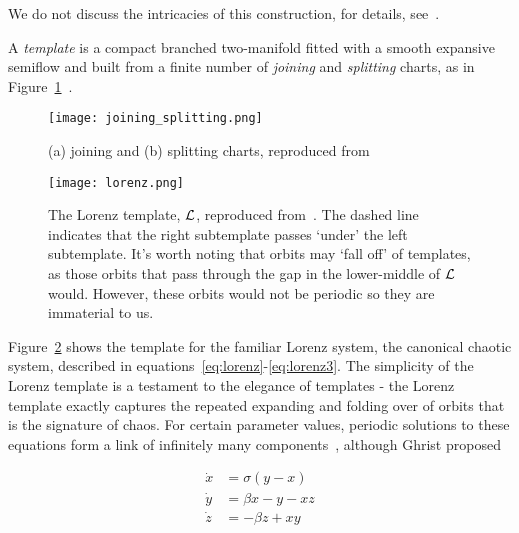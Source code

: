 \documentclass[paper.tex]{subfiles}
\begin{document}
We do not discuss the intricacies of this construction, for details, see~\cite{bw1983b}.


\begin{definition}[Template]
  A \emph{template} is a compact branched two-manifold fitted with a smooth expansive semiflow and built from a finite number of \emph{joining} and \emph{splitting} charts, as in Figure~\ref{fig:joinsplit}~\cite{knottyode}.\label{def:template}
\end{definition}


\begin{figure}[h]
  \centering
  \texttt{[image: joining\_splitting.png]}
  \caption[what goes here]{(a) joining and (b) splitting charts, reproduced from~\cite{knottyode}\protect\footnotemark}\label{fig:joinsplit}
\end{figure}






\begin{figure}[h]
  \centering
  \texttt{[image: lorenz.png]}
  \caption{The Lorenz template, $\mathcal{L}$, reproduced from~\cite{knottyode}. The dashed line indicates that the right subtemplate passes `under' the left subtemplate. It's worth noting that orbits may `fall off' of templates, as those orbits
  that pass through the gap in the lower-middle of $\mathcal{L}$ would. However, these orbits would not be periodic so they are immaterial to us.}\label{fig:lorenz}
\end{figure}

Figure~\ref{fig:lorenz} shows the template for the familiar Lorenz system, the canonical chaotic system, described in equations~\ref{eq:lorenz}-\ref{eq:lorenz3}. The simplicity of the Lorenz template is a testament to the elegance of
templates - the Lorenz template exactly captures the repeated expanding and folding over of orbits that is the signature of chaos. For certain parameter values, periodic solutions to these equations form a link of infinitely
many components~\cite{knottyode}, although Ghrist proposed 

\begin{align}
  \label{eq:lorenz}
  \dot{x} &= \sigma(y - x ) \\
  \label{eq:lorenz2}
  \dot{y} &= \beta x - y - x z \\
  \label{eq:lorenz3}
  \dot{z} &= - \beta z + x y
\end{align}
\end{document}
